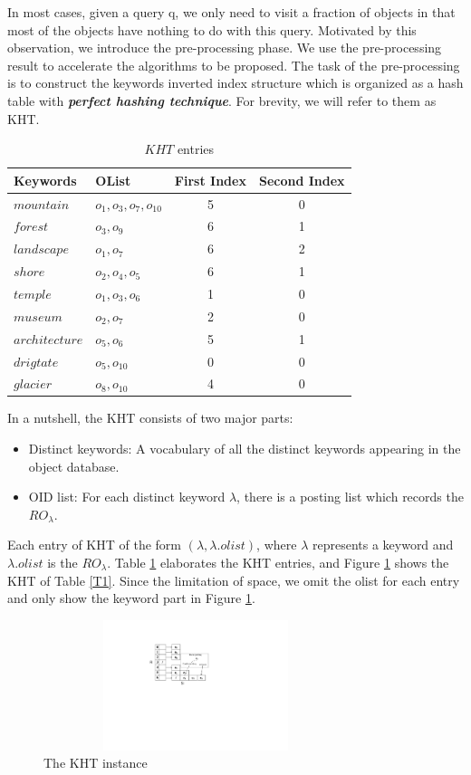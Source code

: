 In most cases, given a query q, we only need to visit a fraction of objects in that most of the objects have nothing to do with this query. Motivated by this observation, we introduce the pre-processing phase. We use the pre-processing result to accelerate the algorithms to be proposed. The task of the pre-processing is to construct the keywords inverted index structure which is organized as a hash table with \textbf{\textit{perfect hashing technique}}. For brevity, we will refer to them as KHT.
\begin{table}
\centering
\begin{tabular}{|l|l|c|c|}
\hline
Keywords & OList & First Index & Second Index \\
\hline \hline
$mountain$ & $o_1,o_3,o_7,o_{10}$ & 5 & 0\\
\hline
$forest$ & $o_3,o_9$ & 6 & 1 \\
\hline
$landscape$ & $o_1,o_7$ & 6 & 2 \\
\hline
$shore$ & $o_2,o_4,o_5$ & 6 & 1 \\
\hline
$temple$ & $o_1,o_3,o_6$ & 1 & 0 \\
\hline
$museum$ & $o_2,o_7$ & 2 & 0 \\
\hline
$architecture$ & $o_5,o_6$ & 5 & 1 \\
\hline
$drigtate$ & $o_5,o_{10}$ & 0 & 0 \\
\hline
$glacier$ & $o_8,o_{10}$ & 4 & 0 \\
\hline
\end{tabular}
\caption{$KHT$ entries}\label{T4}
\end{table}

In a nutshell, the KHT consists of two major parts:
\begin{itemize}
    \item Distinct keywords: A vocabulary of all the distinct keywords appearing in the object database.
    \item OID list: For each distinct keyword $\lambda$, there is a posting list which records the $RO_\lambda$.
\end{itemize}

Each entry of KHT of the form $(\lambda,\lambda.olist)$, where $\lambda$ represents a keyword and $\lambda.olist$ is the $RO_\lambda$. Table \ref{T4} elaborates the KHT entries, and Figure \ref{F1} shows the KHT of Table \ref{T1}. Since the limitation of space, we omit the olist for each entry and only show the keyword part in Figure \ref{F1}.
\begin{figure}
\centering
\includegraphics[width=3.5in,height=1.5in]{KHT}
\caption{The KHT instance} \label{F1}
\end{figure}

